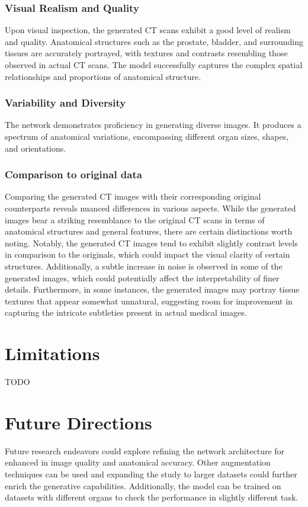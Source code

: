 \documentclass[11pt,a4paper]{report}
\begin{document}
\subsubsection{Visual Realism and Quality}
Upon visual inspection, the generated CT scans exhibit a good level of realism and quality. Anatomical structures such as the prostate, bladder, and surrounding tissues are accurately portrayed, with textures and contrasts resembling those observed in actual CT scans. The model successfully captures the complex spatial relationships and proportions of anatomical structure.
\subsubsection{Variability and Diversity}
The network demonstrates proficiency in generating diverse images. It produces a spectrum of anatomical variations, encompassing different organ sizes, shapes, and orientations.
\subsubsection{Comparison to original data}
Comparing the generated CT images with their corresponding original counterparts reveals nuanced differences in various aspects. While the generated images bear a striking resemblance to the original CT scans in terms of anatomical structures and general features, there are certain distinctions worth noting. Notably, the generated CT images tend to exhibit slightly contrast levels in comparison to the originals, which could impact the visual clarity of certain structures. Additionally, a subtle increase in noise is observed in some of the generated images, which could potentially affect the interpretability of finer details. Furthermore, in some instances, the generated images may portray tissue textures that appear somewhat unnatural, suggesting room for improvement in capturing the intricate subtleties present in actual medical images.


\section{Limitations}
TODO
\section{Future Directions}
Future research endeavors could explore refining the network architecture for enhanced in image quality and anatomical accuracy. Other augmentation techniques can be used and expanding the study to larger datasets could further enrich the generative capabilities. Additionally, the model can be trained on datasets with different organs to check the performance in slightly different task.
\end{document}
